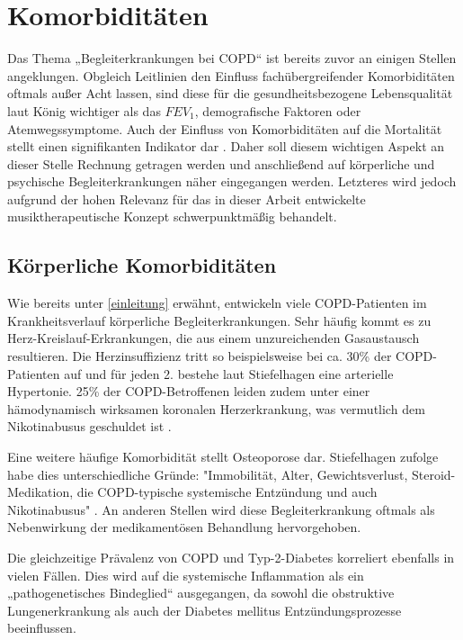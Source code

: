 \section{Komorbiditäten}
\label{komorbiditaeten}
Das Thema „Begleiterkrankungen bei COPD“ ist bereits zuvor an einigen Stellen angeklungen. Obgleich Leitlinien den Einfluss fachübergreifender Komorbiditäten oftmals außer Acht lassen, sind diese für die gesundheitsbezogene Lebensqualität laut König wichtiger als das $FEV_{1}$, demografische Faktoren oder Atemwegssymptome. Auch der Einfluss von Komorbiditäten auf die Mortalität stellt einen signifikanten Indikator dar \autocite[vgl.][395]{koenig2007}.
Daher soll diesem wichtigen Aspekt an dieser Stelle Rechnung getragen werden und anschließend auf körperliche und psychische Begleiterkrankungen näher eingegangen werden. Letzteres wird jedoch aufgrund der hohen Relevanz für das in dieser Arbeit entwickelte musiktherapeutische Konzept schwerpunktmäßig behandelt.


\subsection{Körperliche Komorbiditäten}
Wie bereits unter \ref{einleitung} erwähnt, entwickeln viele COPD-Patienten im Krankheitsverlauf körperliche Begleiterkrankungen. Sehr häufig kommt es zu Herz-Kreislauf-Erkrankungen, die aus einem unzureichenden Gasaustausch resultieren. Die Herzinsuffizienz tritt so beispielsweise bei ca. 30\% der COPD-Patienten auf und für jeden 2. bestehe laut Stiefelhagen eine arterielle Hypertonie. 25\% der COPD-Betroffenen leiden zudem unter einer hämodynamisch wirksamen koronalen Herzerkrankung, was vermutlich dem Nikotinabusus geschuldet ist \autocite[vgl.][37]{stiefelhagen2013}.

Eine weitere häufige Komorbidität stellt Osteoporose dar. Stiefelhagen zufolge habe dies unterschiedliche Gründe: "Immobilität, Alter, Gewichtsverlust, Steroid-Medikation, die COPD-typische systemische Entzündung und auch Nikotinabusus" \autocite[37]{stiefelhagen2013}. An anderen Stellen wird diese Begleiterkrankung oftmals als Nebenwirkung der medikamentösen Behandlung hervorgehoben. 

Die gleichzeitige Prävalenz von COPD und Typ-2-Diabetes korreliert ebenfalls in vielen Fällen. Dies wird auf die systemische Inflammation als ein „pathogenetisches Bindeglied“ ausgegangen, da sowohl die obstruktive Lungenerkrankung als auch der Diabetes mellitus Entzündungsprozesse beeinflussen.

